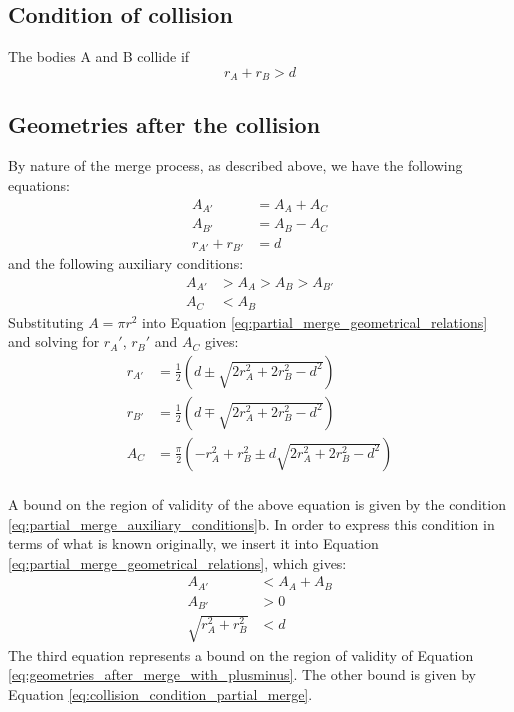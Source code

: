 \documentclass{article}
\begin{document}
\subsection{Condition of collision}
The bodies A and B collide if
\begin{equation}
\label{eq:collision_condition_partial_merge}
r_A + r_B > d
\end{equation}

\subsection{Geometries after the collision}
By nature of the merge process, as described above, we have the following equations:
\begin{equation}
\label{eq:partial_merge_geometrical_relations}
\begin{split}
A_{A'} &= A_A + A_C\\
A_{B'} &= A_B - A_C\\
r_{A'} + r_{B'} &= d
\end{split}
\end{equation}
%
and the following auxiliary conditions:
%
\begin{equation}
\label{eq:partial_merge_auxiliary_conditions}
\begin{split}
A_{A'} &> A_A > A_B > A_{B'}\\
A_C &< A_B
\end{split}
\end{equation}
Substituting $A = \pi r^2$ into Equation \ref{eq:partial_merge_geometrical_relations} and solving for $r_A'$, $r_B'$ and $A_C$ gives:
\begin{equation}
\label{eq:geometries_after_merge_with_plusminus}
\begin{split}
r_{A'} &= \frac{1}{2}\left(d \pm \sqrt{2r_A^2 + 2r_B^2 - d^2}\right)\\
r_{B'} &= \frac{1}{2}\left(d \mp \sqrt{2r_A^2 + 2r_B^2 - d^2}\right)\\
A_C &= \frac{\pi}{2}\left(-r_A^2 + r_B^2 \pm d\sqrt{2r_A^2 + 2r_B^2 - d^2}\right)\\
\end{split}
\end{equation}

A bound on the region of validity of the above equation is given by the condition \ref{eq:partial_merge_auxiliary_conditions}b. In order to express this condition in terms of what is known originally, we insert it into Equation \ref{eq:partial_merge_geometrical_relations}, which gives:
\begin{equation}
\label{eq:region_of_validity}
\begin{split}
A_{A'} &< A_A + A_B\\
A_{B'} &> 0\\
\sqrt{r_A^2 + r_B^2} &< d
\end{split}
\end{equation}
The third equation represents a bound on the region of validity of Equation \ref{eq:geometries_after_merge_with_plusminus}. The other bound is given by Equation \ref{eq:collision_condition_partial_merge}.
\end{document}
